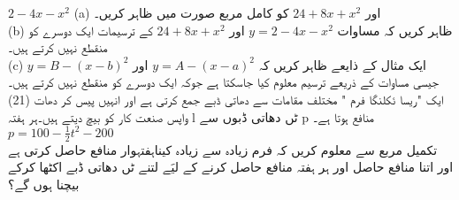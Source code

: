 $ 2-4x-x^2 $ (a)
اور
$  24+8x+x^2 $
کو کامل مربع صورت میں ظاہر کریں۔\\(b)
ظاہر کریں کہ مساوات 
$ y=2-4x-x^2 $
اور
$ 24+8x+x^2 $
کے ترسیمات ایک دوسرے کو منقطع نہیں کرتے ہیں۔ \\ (c)
ایک مثال کے ذایعے ظاہر کریں کہ 
$y=A-(x-a)^2$
اور
$y=B-(x-b)^2$
جیسی مساوات کے ذریعے ترسیم معلوم کیا جاسکتا ہے جوکہ ایک دوسرے کو منقطع نہیں کرتے ہیں۔\\(21)
ایک "ریسا ئکلنگا فرم " مختلف مقامات سے دھاتی ڈبے جمع کرتی ہے اور انہیں پیس کر دھات واپس صنعت کار کو بیچ دیتے ہیں۔ہر ہفتہ l ٹں دھاتی ڈبوں سے p منافع ہوتا ہے۔
\(p=100-\frac{1}{2}t^{2}-200\)\\
تکمیل مربع سے معلوم کریں کہ فرم زیادہ سے زیادہ کیناہفتہوار منافع حاصل کرتی ہے اور اتنا منافع حاصل اور ہر ہفتہ منافع حاصل کرنے کے لیَے لتنے ٹں دھاتی ڈبے اکٹھا کرکے بیچنا ہوں گے؟
 
